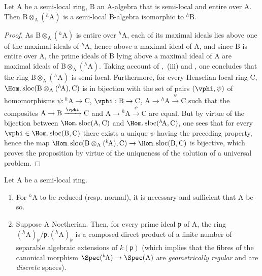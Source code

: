 \begin{proposition}[18.6.8]
\label{IV.18.6.8}
Let $\mathrm{A}$ be a semi-local ring, $\mathrm{B}$ an A-algebra that is semi-local and entire over $\mathrm{A}$.
Then $\mathrm{B}\otimes_{\mathrm{A}}({}^h\!\mathrm{A})$ is a semi-local B-algebra isomorphic to ${}^h\!\mathrm{B}$.
\end{proposition}

\begin{proof}
As $\mathrm{B}\otimes_{\mathrm{A}}({}^h\!\mathrm{A})$ is entire over ${}^h\!\mathrm{A}$, each of its maximal ideals lies above one of the maximal ideals of ${}^h\!\mathrm{A}$, hence above a maximal ideal of A, and since B is entire over A, the prime ideals of B lying above a maximal ideal of A are maximal ideals of $\mathrm{B}\otimes_{\mathrm{A}}({}^h\!\mathrm{A})$.
Taking account of ,~(iii) and , one concludes that the ring $\mathrm{B}\otimes_{\mathrm{A}}({}^h\!\mathrm{A})$ is semi-local.
Furthermore, for every Henselian local ring C, $\Hom.\operatorname{sloc}(\mathrm{B}\otimes_{\mathrm{A}}({}^h\!\mathrm{A}),\mathrm{C})$ is in bijection with the set of pairs $(\vphi,\psi)$ of homomorphisms
$\psi:{}^h\!\mathrm{A}\to\mathrm{C}$, $\vphi:\mathrm{B}\to\mathrm{C}$, $\mathrm{A}\to{}^h\!\mathrm{A}\xrightarrow{\psi}\mathrm{C}$
such that the composites $\mathrm{A}\to\mathrm{B}\xrightarrow{\vphi}\mathrm{C}$ and $\mathrm{A}\to{}^h\!\mathrm{A}\xrightarrow{\psi}\mathrm{C}$ are equal.
But by virtue of the bijection between $\Hom.\operatorname{sloc}(\mathrm{A},\mathrm{C})$ and $\Hom.\operatorname{sloc}({}^h\!\mathrm{A},\mathrm{C})$, one sees that for every $\vphi\in\Hom.\operatorname{sloc}(\mathrm{B},\mathrm{C})$ there exists a unique $\psi$ having the preceding property, hence the map $\Hom.\operatorname{sloc}(\mathrm{B}\otimes_{\mathrm{A}}({}^h\!\mathrm{A}),\mathrm{C})\to\Hom.\operatorname{sloc}(\mathrm{B},\mathrm{C})$ is bijective, which proves the proposition by virtue of the uniqueness of the solution of a universal problem.
\end{proof}

\begin{theorem}[18.6.9]
\label{IV.18.6.9}
Let $\mathrm{A}$ be a semi-local ring.
\begin{enumerate}[label=\emph{\roman*)}]
  \item For ${}^h\!\mathrm{A}$ to be reduced (resp. normal), it is necessary and sufficient that A be so.
  \item Suppose A Noetherian.
  Then, for every prime ideal $\mathfrak{p}$ of A, the ring $({}^h\!\mathrm{A})_{\mathfrak{p}}/\mathfrak{p}.({}^h\!\mathrm{A})_{\mathfrak{p}}$ is a composed direct product of a finite number of separable algebraic extensions of $k(\mathfrak{p})$ (which implies that the fibres of the canonical morphism $\Spec({}^h\!\mathrm{A})\to\Spec(\mathrm{A})$ are \emph{geometrically regular}  and are \emph{discrete} spaces).
\end{enumerate}
\end{theorem}

